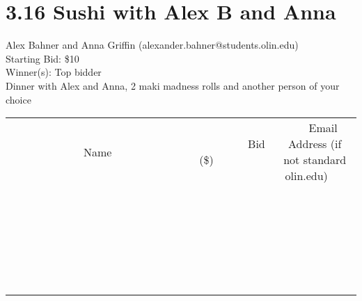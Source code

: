 \documentclass[11pt]{article}
\begin{document}
\section*{3.16 Sushi with Alex B and Anna}
Alex Bahner and Anna Griffin (alexander.bahner@students.olin.edu) \\
Starting Bid: \$10 \\
Winner(s): 
Top bidder \\
Dinner with Alex and Anna, 2 maki madness rolls and another person of your choice \\[6ex]
\begin{tabular}{c c c}
~~~~~~~~~~~~~Name~~~~~~~~~~~~~ & ~~~~~~~~~Bid (\$)~~~~~~~~~ & ~~~Email Address (if not standard olin.edu)~~~ \\
 & & \\
\hline
 & & \\
\hline
 & & \\
\hline
 & & \\
\hline
 & & \\
\hline
 & & \\
\hline
 & & \\
\hline
 & & \\
\hline
 & & \\
\hline
 & & \\
\hline
 & & \\
\hline
 & & \\
\hline
 & & \\
\hline
 & & \\
\hline
 & & \\
\hline
 & & \\
\hline
 & & \\
\hline
 & & \\
\hline
 & & \\
\hline
 & & \\
\hline
 & & \\
\hline
 & & \\
\hline
 & & \\
\hline
 & & \\
\hline
 & & \\
\hline
 & & \\
\hline
\end{tabular}
\clearpage
\end{document}
